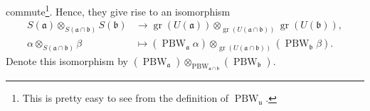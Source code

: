 \documentclass[etingof-lie.tex]{subfiles}
\begin{document}
commute\footnote{This is pretty easy to see from the definition of
$\operatorname*{PBW}\nolimits_{\mathfrak{u}}$.}. Hence, they give rise to an
isomorphism%
\begin{align*}
S\left(  \mathfrak{a}\right)  \otimes_{S\left(  \mathfrak{a}\cap
\mathfrak{b}\right)  }S\left(  \mathfrak{b}\right)   &  \rightarrow
\operatorname*{gr}\left(  U\left(  \mathfrak{a}\right)  \right)
\otimes_{\operatorname*{gr}\left(  U\left(  \mathfrak{a}\cap\mathfrak{b}%
\right)  \right)  }\operatorname*{gr}\left(  U\left(  \mathfrak{b}\right)
\right)  ,\\
\alpha\otimes_{S\left(  \mathfrak{a}\cap\mathfrak{b}\right)  }\beta &
\mapsto\left(  \operatorname*{PBW}\nolimits_{\mathfrak{a}}\alpha\right)
\otimes_{\operatorname*{gr}\left(  U\left(  \mathfrak{a}\cap\mathfrak{b}%
\right)  \right)  }\left(  \operatorname*{PBW}\nolimits_{\mathfrak{b}}%
\beta\right)  .
\end{align*}
Denote this isomorphism by $\left(  \operatorname*{PBW}\nolimits_{\mathfrak{a}%
}\right)  \otimes_{\operatorname*{PBW}\nolimits_{\mathfrak{a}\cap\mathfrak{b}%
}}\left(  \operatorname*{PBW}\nolimits_{\mathfrak{b}}\right)  $.
\end{document}
